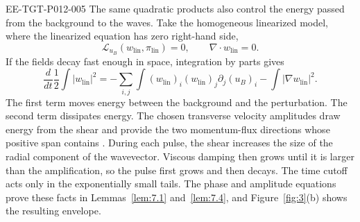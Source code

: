 \begin{EESegment}{EE-TGT-P012-005}
The same quadratic products also control the energy passed from the background to the waves.
Take the homogeneous linearized model, where the linearized equation has zero right-hand side,
\[
 \mathcal L_{u_B}(w_{\mathrm{lin}},\pi_{\mathrm{lin}})=0,
 \qquad \nabla\cdot w_{\mathrm{lin}}=0.
\]
If the fields decay fast enough in space, integration by parts gives
\[
 \frac d{dt}\frac12\int|w_{\mathrm{lin}}|^2
 =-\sum_{i,j}\int(w_{\mathrm{lin}})_i(w_{\mathrm{lin}})_j\partial_j(u_B)_i
   -\int|\nabla w_{\mathrm{lin}}|^2.
\]
The first term moves energy between the background and the perturbation. The second term
dissipates energy. The chosen transverse velocity amplitudes draw energy from the shear and
provide the two momentum-flux directions whose positive span contains
. During each pulse, the shear increases the size of the radial component of
the wavevector. Viscous damping then grows until it is larger than the amplification, so the pulse
first grows and then decays. The time cutoff acts only in the exponentially small tails. The phase
and amplitude equations prove these facts in Lemmas~\ref{lem:7.1} and~\ref{lem:7.4}, and
Figure~\ref{fig:3}(b) shows the resulting envelope.
\end{EESegment}
